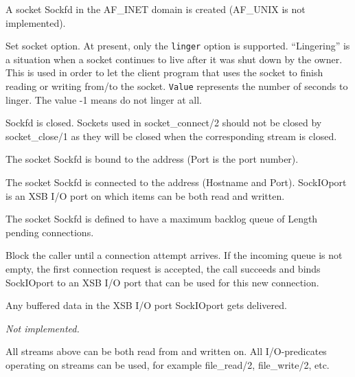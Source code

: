 \begin{description}
    A socket Sockfd in the AF\_INET domain is created (AF\_UNIX is not
implemented). 

    Set socket option. At present, only the {\tt linger} option is
    supported. ``Lingering'' is a situation when a socket continues to live
    after it was shut down by the owner. This is used in order to let the
    client program that uses the socket to finish reading or writing
    from/to the socket. {\tt Value} represents the number of seconds to linger.
    The value -1 means do not linger at all.

    Sockfd is closed. Sockets used in socket\_connect/2 should not be
closed by socket\_close/1 as they will be closed when the corresponding
stream is closed.

   The socket Sockfd is bound to the address (Port is the port number).

    The socket Sockfd is connected to the address (Hostname and
Port). SockIOport is an XSB I/O port on which items can be both read and
    written. 

    The socket Sockfd is defined to have a maximum backlog queue of
Length pending connections.

    Block the caller until a connection attempt arrives. If the incoming 
    queue is not empty, the first connection request is accepted, the call
    succeeds and binds SockIOport to an XSB I/O port that can be used for
    this new connection.

    Any buffered data in the XSB I/O port SockIOport gets delivered.

  \emph{Not implemented.}

\end{description}

All streams above can be both read from and written on. All
I/O-predicates operating on streams can be used, for example
file\_read/2, file\_write/2, etc.


